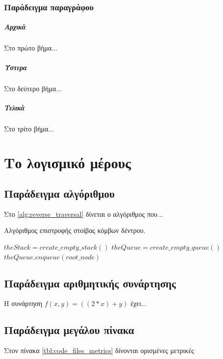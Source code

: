 \documentclass[12pt,a4paper]{report}%
\begin{document}
\subsection{Παράδειγμα παραγράφου}

\paragraph{Αρχικά}
Στο πρώτο βήμα...


\paragraph{Ύστερα}
Στο δεύτερο βήμα...

\paragraph{Τελικά}
Στο τρίτο βήμα...

\chapter{Το λογισμικό μέρους}

\section{Παράδειγμα αλγόριθμου}
Στο \ref{alg:reverse_traversal} δίνεται ο αλγόριθμος που...

\begin{algorithm}[h!]
\SetAlgoLined
\caption{Αλγόριθμος επιστροφής στοίβας κόμβων δέντρου.}\label{alg:reverse_traversal}
 $theStack = create\_empty\_stack()$\;
 $theQueue = create\_empty\_queue()$\;
 $theQueue.enqueue(root\_node)$\;
\end{algorithm}


\section{Παράδειγμα αριθμητικής συνάρτησης}
Η συνάρτηση $f(x,y)=((2*x)+y)$ έχει...



\section{Παράδειγμα μεγάλου πίνακα}
Στον πίνακα \ref{tbl:code_files_metrics} δίνονται ορισμένες μετρικές
\end{document}
